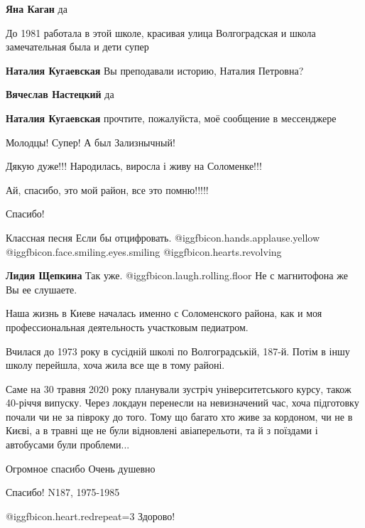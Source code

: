 \begin{itemize}
\textbf{Яна Каган} да

До 1981 работала в этой школе, красивая улица Волгоградская и школа замечательная была и дети супер

\begin{itemize} %
\textbf{Наталия Кугаевская} Вы преподавали историю, Наталия Петровна?

\textbf{Вячеслав Настецкий} да

\textbf{Наталия Кугаевская} прочтите, пожалуйста, моё сообщение в мессенджере
\end{itemize} %

Молодцы! Супер! А был Зализнычный!

Дякую дуже!!! Народилась, виросла і живу на Соломенке!!!

Ай, спасибо, это мой район, все это помню!!!!!

Спасибо!


Классная песня Если бы отцифровать. @igg{fbicon.hands.applause.yellow}
@igg{fbicon.face.smiling.eyes.smiling}  @igg{fbicon.hearts.revolving} 

\textbf{Лидия Щепкина} Так уже.  @igg{fbicon.laugh.rolling.floor}  Не с магнитофона же Вы ее слушаете.

Наша жизнь в Киеве началась именно с Соломенского района, как и моя профессиональная деятельность участковым педиатром.


Вчилася до 1973 року в сусідній школі по Волгоградській, 187-й. Потім в іншу
школу перейшла, хоча жила все ще в тому районі.

Саме на 30 травня 2020 року планували зустріч університетського курсу, також
40-річчя випуску. Через локдаун перенесли на невизначений час, хоча підготовку
почали чи не за півроку до того. Тому що багато хто живе за кордоном, чи не в
Києві, а в травні ще не були відновлені авіаперельоти, та й з поїздами і
автобусами були проблеми...


Огромное спасибо Очень душевно

Спасибо!
N187, 1975-1985


@igg{fbicon.heart.red}{repeat=3}
Здорово!

\end{itemize} %
